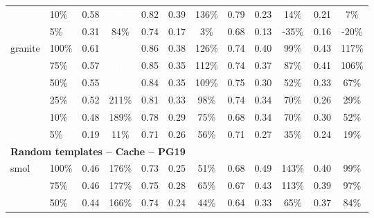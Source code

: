 \begin{longtable}{llcccccccccc}
 & 10\% & 0.58 & \cellcolor{tablegreen!70}\textcolor{white}{246\%} & 0.82 & 0.39 & \cellcolor{tablegreen!39}136\% & 0.79 & 0.23 & \cellcolor{tablegreen!4}14\% & 0.21 & \cellcolor{tablegreen!2}7\% \\
 & 5\% & 0.31 & \cellcolor{tablegreen!24}84\% & 0.74 & 0.17 & \cellcolor{tablegreen!1}3\% & 0.68 & 0.13 & \cellcolor[HTML]{E8A0A0}-35\% & 0.16 & \cellcolor[HTML]{E8A0A0}-20\% \\
\cmidrule(l){1-12}
\multirow{6}{*}{granite} & 100\% & 0.61 & \cellcolor{tablegreen!76}\textcolor{white}{265\%} & 0.86 & 0.38 & \cellcolor{tablegreen!36}126\% & 0.74 & 0.40 & \cellcolor{tablegreen!28}99\% & 0.43 & \cellcolor{tablegreen!33}117\% \\
 & 75\% & 0.57 & \cellcolor{tablegreen!69}\textcolor{white}{241\%} & 0.85 & 0.35 & \cellcolor{tablegreen!32}112\% & 0.74 & 0.37 & \cellcolor{tablegreen!25}87\% & 0.41 & \cellcolor{tablegreen!30}106\% \\
 & 50\% & 0.55 & \cellcolor{tablegreen!65}\textcolor{white}{227\%} & 0.84 & 0.35 & \cellcolor{tablegreen!31}109\% & 0.75 & 0.30 & \cellcolor{tablegreen!15}52\% & 0.33 & \cellcolor{tablegreen!19}67\% \\
 & 25\% & 0.52 & \cellcolor{tablegreen!60}211\% & 0.81 & 0.33 & \cellcolor{tablegreen!28}98\% & 0.74 & 0.34 & \cellcolor{tablegreen!20}70\% & 0.26 & \cellcolor{tablegreen!8}29\% \\
 & 10\% & 0.48 & \cellcolor{tablegreen!54}189\% & 0.78 & 0.29 & \cellcolor{tablegreen!21}75\% & 0.68 & 0.34 & \cellcolor{tablegreen!20}70\% & 0.30 & \cellcolor{tablegreen!15}52\% \\
 & 5\% & 0.19 & \cellcolor{tablegreen!3}11\% & 0.71 & 0.26 & \cellcolor{tablegreen!16}56\% & 0.71 & 0.27 & \cellcolor{tablegreen!10}35\% & 0.24 & \cellcolor{tablegreen!5}19\% \\
\midrule
\multicolumn{12}{l}{\textbf{Random templates -- Cache -- PG19}} \\
\multirow{6}{*}{smol} & 100\% & 0.46 & \cellcolor{tablegreen!50}176\% & 0.73 & 0.25 & \cellcolor{tablegreen!14}51\% & 0.68 & 0.49 & \cellcolor{tablegreen!41}143\% & 0.40 & \cellcolor{tablegreen!28}99\% \\
 & 75\% & 0.46 & \cellcolor{tablegreen!51}177\% & 0.75 & 0.28 & \cellcolor{tablegreen!19}65\% & 0.67 & 0.43 & \cellcolor{tablegreen!32}113\% & 0.39 & \cellcolor{tablegreen!28}97\% \\
 & 50\% & 0.44 & \cellcolor{tablegreen!47}166\% & 0.74 & 0.24 & \cellcolor{tablegreen!13}44\% & 0.64 & 0.33 & \cellcolor{tablegreen!19}65\% & 0.37 & \cellcolor{tablegreen!24}84\% \\

\end{longtable}
